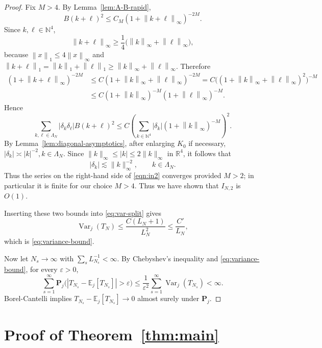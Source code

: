 \documentclass[11pt, reqno]{amsart}
\theoremstyle{remark}
\newcommand{\N}{\mathbb{N}}
\newcommand{\E}{\mathbb{E}}
\newcommand{\1}{\mathbf{1}}
\newcommand{\abs}[1]{\left\lvert #1 \right\rvert}
\newcommand{\norm}[1]{\left\lVert #1 \right\rVert}
\begin{document}
\begin{proof}
Fix $M>4$. By Lemma~\ref{lem:A-B-rapid},
\[
B(k+\ell)^2\le C_M(1+\norm{k+\ell}_\infty)^{-2M}.
\]
Since $k,\ell\in\N^4$,
\[
\norm{k+\ell}_\infty \ge \frac14\big(\norm{k}_\infty+\norm{\ell}_\infty\big),
\]
because $\norm{x}_1\le 4\norm{x}_\infty$ and $\norm{k+\ell}_1=\norm{k}_1+\norm{\ell}_1\ge \norm{k}_\infty+\norm{\ell}_\infty$. Therefore
\begin{align*}
(1+\norm{k+\ell}_\infty)^{-2M}
&\le C(1+\norm{k}_\infty+\norm{\ell}_\infty)^{-2M} = C\Big((1+\norm{k}_\infty+\norm{\ell}_\infty)^2\Big)^{-M} \\
&\leq C(1+\norm{k}_\infty)^{-M}(1+\norm{\ell}_\infty)^{-M}.
\end{align*}
Hence
\begin{equation} \label{eqn:in2}
\sum_{k,\ell\in\Lambda_N}\abs{\delta_k\delta_\ell}B(k+\ell)^2
\le C\left(\sum_{k\in\N^4}\abs{\delta_k}(1+\norm{k}_\infty)^{-M}\right)^2.
\end{equation}
By Lemma~\ref{lem:diagonal-asymptotics}, after enlarging \(K_0\) if necessary,
$
|\delta_k| \asymp |k|^{-2}, k\in\Lambda_N.
$
Since \(\|k\|_\infty \le |k| \le 2\|k\|_\infty\) in \(\mathbb R^4\), it follows that
\[
|\delta_k|\lesssim \|k\|_\infty^{-2}, \qquad k\in\Lambda_N.
\]
Thus the series on the right-hand side of \eqref{eqn:in2} converges provided $M>2$; in particular it is finite for our choice $M>4$. Thus we have shown that $I_{N,2}$ is $O(1)$.

Inserting these two bounds into \eqref{eq:var-split} gives
\[
\operatorname{Var}_j(T_N)\le \frac{C(L_N+1)}{L_N^2}\le \frac{C'}{L_N},
\]
which is \eqref{eq:variance-bound}.

Now let $N_s\to\infty$ with $\sum_s L_{N_s}^{-1}<\infty$. By Chebyshev's inequality and \eqref{eq:variance-bound}, for every $\varepsilon>0$,
\[
\sum_{s=1}^\infty \mathbf P_j\big(\abs{T_{N_s}-\E_j[T_{N_s}]}>\varepsilon\big)
\le \frac1{\varepsilon^2}\sum_{s=1}^\infty \operatorname{Var}_j(T_{N_s})<\infty.
\]
Borel-Cantelli implies $T_{N_s}-\E_j[T_{N_s}]\to 0$ almost surely under $\mathbf P_j$.
\end{proof}

\section{Proof of Theorem~\ref{thm:main}}
\end{document}
